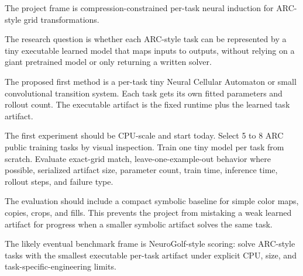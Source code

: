 \begin{tcolorbox}[
  colback=blue!4,
  colframe=blue!40,
  title=Atelier,
  fonttitle=\bfseries\small,
  fontupper=\small,
  arc=2pt,
  boxsep=3pt,
  left=4pt, right=4pt, top=3pt, bottom=3pt
]
The project frame is compression-constrained per-task neural induction for ARC-style grid transformations.

The research question is whether each ARC-style task can be represented by a tiny executable learned model that maps inputs to outputs, without relying on a giant pretrained model or only returning a written solver.

The proposed first method is a per-task tiny Neural Cellular Automaton or small convolutional transition system. Each task gets its own fitted parameters and rollout count. The executable artifact is the fixed runtime plus the learned task artifact.

The first experiment should be CPU-scale and start today. Select 5 to 8 ARC public training tasks by visual inspection. Train one tiny model per task from scratch. Evaluate exact-grid match, leave-one-example-out behavior where possible, serialized artifact size, parameter count, train time, inference time, rollout steps, and failure type.

The evaluation should include a compact symbolic baseline for simple color maps, copies, crops, and fills. This prevents the project from mistaking a weak learned artifact for progress when a smaller symbolic artifact solves the same task.

The likely eventual benchmark frame is NeuroGolf-style scoring: solve ARC-style tasks with the smallest executable per-task artifact under explicit CPU, size, and task-specific-engineering limits.
\end{tcolorbox}
